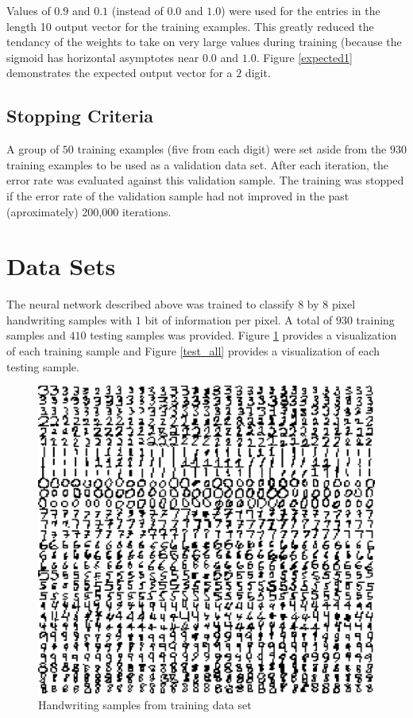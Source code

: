 \documentclass{article}
\begin{document}
Values of \(0.9\) and \(0.1\) (instead of \(0.0\) and \(1.0\)) were used for the entries in the length 10 output vector for the training examples. This greatly reduced the tendancy of the weights to take on very large values during training (because the sigmoid has horizontal asymptotes near \(0.0\) and \(1.0\). Figure \ref{expected1} demonstrates the expected output vector for a \(2\) digit.

\subsection{Stopping Criteria}

A group of \(50\) training examples (five from each digit) were set aside from the \(930\) training examples to be used as a validation data set. After each iteration, the error rate was evaluated against this validation sample. The training was stopped if the error rate of the validation sample had not improved in the past (aproximately) 200,000 iterations.

\section{Data Sets}\label{Dataset}

The neural network described above was trained to classify \(8\) by \(8\) pixel handwriting samples with \(1\) bit of information per pixel. A total of \(930\) training samples and \(410\) testing samples was provided. Figure \ref{train_all} provides a visualization of each training sample and Figure \ref{test_all} provides a visualization of each testing sample.

\begin{figure}
\centering
\includegraphics[width=1.00\textwidth]{data/visualization/all_training_data.png}
\caption{Handwriting samples from training data set}
\label{train_all}
\end{figure}
\end{document}
